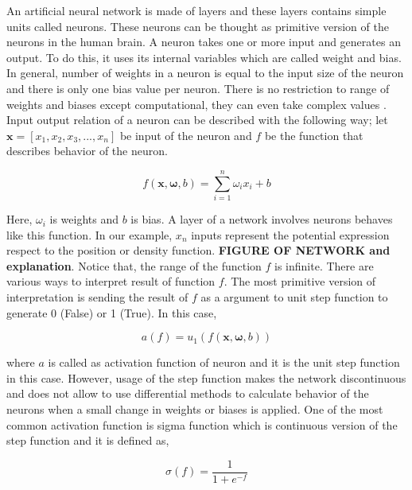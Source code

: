 \documentclass[a4paper,times,12pt]{article}
\begin{document}
An artificial neural network is made of layers and these layers contains simple units called neurons. These neurons can be thought as primitive version of the neurons in the human brain. A neuron takes one or more input and generates an output. To do this, it uses its internal variables which are called weight and bias. In general, number of weights in a neuron is equal to the input size of the neuron and there is only one bias value per neuron. There is no restriction to range of weights and biases except computational, they can even take complex values \cite{zimmermann2011comparison}. Input output relation of a neuron can be described with the following way; let $\boldsymbol{x} = [x_1, x_2, x_3, ..., x_n]$ be input of the neuron and $f$ be the function that describes behavior of the neuron. 

\begin{equation}
\label{eq:NU_neuron}
f(\boldsymbol{x}, \boldsymbol{\omega}, b) = \sum\limits_{i = 1}^n \omega_i x_i + b
\end{equation}

Here, $\omega_i$ is weights and $b$ is bias. A layer of a network involves neurons behaves like this function. In our example, $x_n$ inputs represent the potential expression respect to the position or density function. \textbf{FIGURE OF NETWORK and explanation}. Notice that, the range of the function $f$ is infinite. There are various ways to interpret result of function $f$. The most primitive version of interpretation is sending the result of $f$ as a argument to unit step function to generate 0 (False) or 1 (True). In this case, 

\begin{equation}
\label{eq:NU_step_function}
a(f) = u_1(f(\boldsymbol{x}, \boldsymbol{\omega}, b))
\end{equation}

where $a$ is called as activation function of neuron and it is the unit step function in this case. However, usage of the step function makes the network discontinuous and does not allow to use differential methods to calculate behavior of the neurons when a small change in weights or biases is applied. One of the most common activation function is sigma function which is continuous version of the step function and it is defined as,

\begin{equation}
\label{eq:NU_sigma_function}
\sigma(f) = \frac{1}{1 + e^{-f}}
\end{equation}
\end{document}
